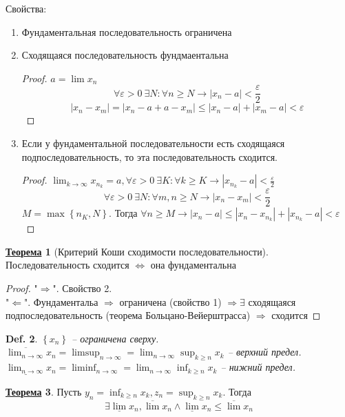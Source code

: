 \documentclass[12pt]{article}
\newenvironment{MyList}[1][4pt]{
  \begin{enumerate}[1.]
  \setlength{\parskip}{0pt}
  \setlength{\itemsep}{#1}
}{       
  \end{enumerate}
}
\def\SO{\Rightarrow}     %
\def\EQ{\Leftrightarrow} %
\theoremstyle{definition} %
\newtheorem{Thm}{\underline{Теорема}}[subsection] %
\theoremstyle{plain} %
\newtheorem{Def}[Thm]{Def.} %
\theoremstyle{remark} %
\begin{document}
Свойства:
\begin{MyList}
    \item Фундаментальная последовательность ограничена
    \item Сходящаяся последовательность фундмаентальна
    \begin{proof}
        $a = \lim x_n$
        \[\forall \varepsilon > 0 \ \exists N : \forall n \geqslant N \to |x_n - a| < \frac{\varepsilon}{2}\]
        \[|x_n - x_m| = |x_n - a + a - x_m| \leqslant |x_n - a| + |x_m - a| < \varepsilon\]  
    \end{proof}
    \item Если у фундаментальной последовательности есть сходящаяся подпоследовательность, то эта последовательность сходится.
    \begin{proof}
        $\lim_{k \to \infty} x_{n_k} = a, \forall \varepsilon > 0 \ \exists K : \forall k \geqslant K \to |x_{n_k} - a| < \frac{\varepsilon}{2}$ 
        \[\forall \varepsilon > 0 \ \exists N : \forall m, n \geqslant N \to |x_n - x_m| < \frac{\varepsilon}{2}\]
        $M = \max \left\{n_K, N\right\}$. Тогда $\forall n \geqslant M \to |x_n - a| \leqslant |x_n - x_{n_k}| + |x_{n_k} - a| < \varepsilon$ 
    \end{proof}
\end{MyList}

\begin{Thm}[Критерий Коши сходимости последовательности]
    Последовательность сходится $\EQ$ она фундаментальна
\end{Thm}

\begin{proof}
    "$\SO$". Свойство 2. \\
    "$\Leftarrow$". Фундаментальа $\SO$ ограничена (свойство 1) $\SO \exists$ сходящаяся подпоследовательность (теорема Больцано-Вейерштрасса) $\SO$ сходится  
\end{proof}

\begin{Def}
    $\left\{x_n\right\}$ -- ограничена сверху. \\
    $\overline{\lim_{n \to \infty}} x_n = \limsup_{n \to \infty} = \lim_{n \to \infty} \sup_{k \geqslant n} x_k$  -- верхний предел. \\
    $\underline{\lim_{n \to \infty}} x_n = \liminf_{n \to \infty} = \lim_{n \to \infty} \inf_{k \geqslant n} x_k$  -- нижний предел. 
\end{Def} 

\begin{Thm}
    Пусть $y_n = \inf_{k \geqslant n}x_k, z_n = \sup_{k \geqslant n} x_k$. Тогда
    \[\exists \underline{\lim} x_n, \overline{\lim} x_n \wedge \underline{\lim} x_n \leqslant \overline{\lim} x_n\] 
\end{Thm}
\end{document}
